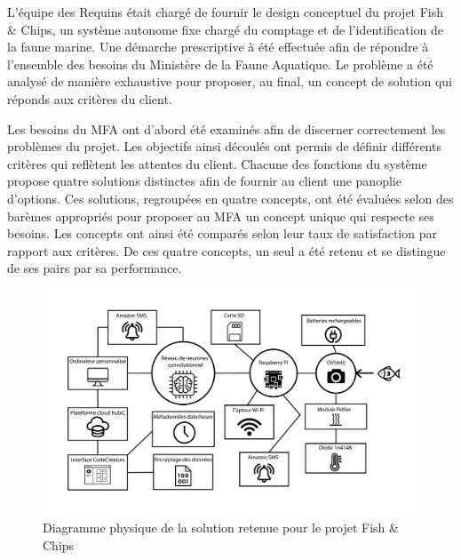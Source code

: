 L'équipe des Requins était chargé de fournir le design conceptuel du projet Fish \& Chips, un système autonome fixe chargé du comptage et de l'identification de la faune marine. Une démarche prescriptive à été effectuée afin de répondre à l'ensemble des besoins du Ministère de la Faune Aquatique. Le problème a été analysé de manière exhaustive pour proposer, au final, un concept de solution qui réponds aux critères du client.

Les besoins du MFA ont d'abord été examinés afin de discerner correctement les problèmes du projet. Les objectifs ainsi découlés ont permis de définir différents critères qui reflètent les attentes du client. Chacune des fonctions du système propose quatre solutions distinctes afin de fournir au client une panoplie d'options. Ces solutions, regroupées en quatre concepts, ont été évaluées selon des barèmes appropriés pour proposer au MFA un concept unique qui respecte ses besoins. Les concepts ont ainsi été comparés selon leur taux de satisfaction par rapport aux critères. De ces quatre concepts, un seul a été retenu et se distingue de ses pairs par sa performance.

\begin{figure}[h]
    \centering
    \includegraphics[width=\linewidth]{fig/schema_designnnnnn.jpg}
    \caption{Diagramme physique de la solution retenue pour le projet Fish \& Chips}
    \label{fig:concept_retenu}
\end{figure}

